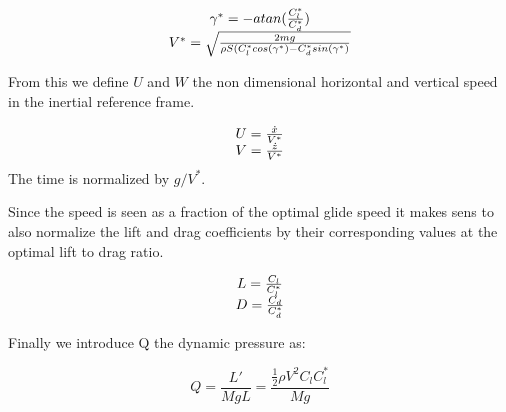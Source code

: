 \begin{equation}
	\begin{array}[c]{c}
		\gamma^*= - atan(\frac{C_l^*}{C_d^*}) \\
		V^* = \sqrt{\frac{2mg}{\rho S (C_l^* cos(\gamma^*) - C_d^* sin(\gamma^*)}}
	\end{array}
	\label{eqn:glide_speed}
\end{equation}

\par From this we define $U$ and $W$ the non dimensional horizontal and vertical speed in the inertial reference frame.

\begin{equation}
	\begin{array}[c]{c}
		U = \frac{\dot{x}}{V^*} \\
		V= \frac{\dot{z}}{V^*}
	\end{array}
	\label{eqn:non_dim_speed}
\end{equation}
The time is normalized by $g / V^*$.

\par Since the speed is seen as a fraction of the optimal glide speed it makes sens to also normalize the lift and drag coefficients by their corresponding values at the optimal lift to drag ratio.

\begin{equation}
	\begin{array}[c]{c}
		L= \frac{C_l}{C_l^*} \\
		D= \frac{C_d}{C_d^*} 
	\end{array}
	\label{eqn:non_dim_coef}
\end{equation}

\par Finally we introduce Q the dynamic pressure as:

\begin{equation}
	Q = \frac{L'}{MgL} = \frac{\frac{1}{2} \rho V^2 C_l C_l^* }{Mg}
	\label{eqn:dynamic_pressure}
\end{equation}








